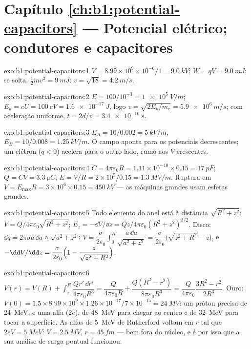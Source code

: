 \section*{Capítulo \ref{ch:b1:potential-capacitors} --- Potencial elétrico; condutores e capacitores}

\begin{solution}{exo:b1:potential-capacitors:1}
$V = 8.99 \times 10^9 \times 10^{-6}/1 = \qty{9.0}{kV}$; $W = qV = \qty{9.0}{mJ}$;
se solta, $\tfrac12mv^2 = \qty{9}{mJ}$: $v = \sqrt{18} = \qty{4.2}{m/s}$.
\end{solution}

\begin{solution}{exo:b1:potential-capacitors:2}
$E = 100/10^{-3} = \qty{1e5}{V/m}$; $E_k = eU = \qty{100}{eV} = \qty{1.6e-17}{J}$,
logo $v = \sqrt{2E_k/m_e} = \qty{5.9e6}{m/s}$; com aceleração uniforme,
$t = 2d/v = \qty{3.4e-10}{s}$.
\end{solution}

\begin{solution}{exo:b1:potential-capacitors:3}
$E_A = 10/0.002 = \qty{5}{kV/m}$, $E_B = 10/0.008 = \qty{1.25}{kV/m}$. O
campo aponta para os potenciais decrescentes; um elétron ($q < 0$)
acelera para o outro lado, rumo aos $V$ crescentes.
\end{solution}

\begin{solution}{exo:b1:potential-capacitors:4}
$C = 4\pi\varepsilon_0R = 1.11 \times 10^{-10} \times 0.15 = \qty{17}{pF}$; $Q = CV =
\qty{3.3}{\micro C}$; $E = V/R = 2 \times 10^5/0.15 = \qty{1.3}{MV/m}$. Ruptura
em $V = E_{\max}R = 3 \times 10^6 \times 0.15 = \qty{450}{kV}$ --- as máquinas grandes
usam esferas grandes.
\end{solution}

\begin{solution}{exo:b1:potential-capacitors:5}
Todo elemento do anel está à distância $\sqrt{R^2 + z^2}$: $V =
Q/4\pi\varepsilon_0\sqrt{R^2 + z^2}$; $E_z = -\dd V/\dd z = Qz/4\pi\varepsilon_0(R^2 +
z^2)^{3/2}$. Disco: $\dd q = 2\pi\sigma a\,\dd a$ a $\sqrt{a^2 + z^2}$: $V =
\dfrac{\sigma}{2\varepsilon_0}\displaystyle\int_0^R\dfrac{a\,\dd a}{\sqrt{a^2 + z^2}} =
\dfrac{\sigma}{2\varepsilon_0}\bigl(\sqrt{z^2 + R^2} - z\bigr)$, e $-\dd V/\dd z =
\dfrac{\sigma}{2\varepsilon_0}\Bigl(1 - \dfrac{z}{\sqrt{z^2 + R^2}}\Bigr)$.
\end{solution}

\begin{solution}{exo:b1:potential-capacitors:6}
$V(r) = V(R) + \displaystyle\int_r^R\dfrac{Qr'\,\dd r'}{4\pi\varepsilon_0R^3} =
\dfrac{Q}{4\pi\varepsilon_0R} + \dfrac{Q(R^2 - r^2)}{8\pi\varepsilon_0R^3} = \dfrac{Q}{4\pi\varepsilon_0}
\dfrac{3R^2 - r^2}{2R^3}$. Ouro: $V(0) = 1.5 \times 8.99 \times 10^9 \times 1.26 \times
10^{-17}/7 \times 10^{-15} = \qty{24}{MV}$: um próton precisa de \qty{24}{MeV}, e uma alfa
($2e$), de \qty{48}{MeV} para chegar ao centro e de \qty{32}{MeV} para tocar a
superfície. As alfas de \qty{5}{MeV} de Rutherford voltam em $r$ tal que $2eV =
\qty{5}{MeV}$: $V = \qty{2.5}{MV}$, $r = \qty{45}{fm}$ --- bem fora do
núcleo, e é por isso que a sua análise de carga pontual funcionou.
\end{solution}

